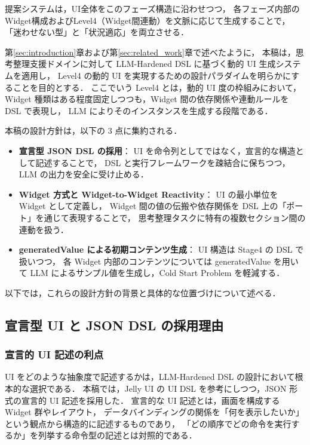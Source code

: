 \documentclass[a4paper,10pt]{jarticle}
\begin{document}
提案システムは，UI全体をこのフェーズ構造に沿わせつつ，
各フェーズ内部のWidget構成およびLevel4（Widget間連動）を文脈に応じて生成することで，
「迷わせない型」と「状況適応」を両立させる．


第\ref{sec:introduction}章および第\ref{sec:related_work}章で述べたように，
本稿は，思考整理支援ドメインに対して LLM-Hardened DSL に基づく動的 UI 生成システムを適用し，
Level4 の動的 UI を実現するための設計パラダイムを明らかにすることを目的とする．
ここでいう Level4 とは，動的 UI 度の枠組みにおいて，
Widget 種類はある程度固定しつつも，Widget 間の依存関係や連動ルールを DSL で表現し，
LLM によりそのインスタンスを生成する段階である．

本稿の設計方針は，以下の 3 点に集約される．

\begin{itemize}
  \item \textbf{宣言型 JSON DSL の採用}：
        UI を命令列としてではなく，宣言的な構造として記述することで，
        DSL と実行フレームワークを疎結合に保ちつつ，
        LLM の出力を安全に受け止める．
  \item \textbf{Widget 方式と Widget-to-Widget Reactivity}：
        UI の最小単位を Widget として定義し，
        Widget 間の値の伝搬や依存関係を DSL 上の「ポート」を通じて表現することで，
        思考整理タスクに特有の複数セクション間の連動を扱う．
  \item \textbf{generatedValue による初期コンテンツ生成}：
        UI 構造は Stage4 の DSL で扱いつつ，
        各 Widget 内部のコンテンツについては generatedValue を用いて
        LLM によるサンプル値を生成し，Cold Start Problem を軽減する．
\end{itemize}

以下では，これらの設計方針の背景と具体的な位置づけについて述べる．

\subsection{宣言型 UI と JSON DSL の採用理由}

\subsubsection{宣言的 UI 記述の利点}

UI をどのような抽象度で記述するかは，LLM-Hardened DSL の設計において根本的な選択である．
本稿では，Jelly UI の UI DSL を参考にしつつ，JSON 形式の宣言的 UI 記述を採用した．
宣言的な UI 記述とは，画面を構成する Widget 群やレイアウト，
データバインディングの関係を「何を表示したいか」という観点から構造的に記述するものであり，
「どの順序でどの命令を実行するか」を列挙する命令型の記述とは対照的である．
\end{document}
